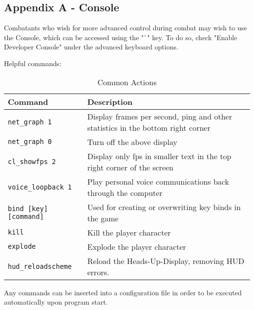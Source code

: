 \subsection{Appendix A - Console}
Combatants who wish for more advanced control during combat may wish to use the Console, which can be accessed using the "`" key. To do so, check "Enable Developer Console" under the advanced keyboard options.

Helpful commands:
\begin{table}[h!b!p!]
\caption{Common Actions}
\begin{tabular}{|l|p{10.5cm}|}
	\hline
		Command & Description\\
	\hline
	\texttt{net\_graph 1}&Display frames per second, ping and other statistics in the bottom right corner\\
	\texttt{net\_graph 0}&Turn off the above display\\
	\texttt{cl\_showfps 2}&Display only fps in smaller text in the top right corner of the screen\\
	\texttt{voice\_loopback 1}&Play personal voice communications back through the computer\\
	\texttt{bind [key] [command]}&Used for creating or overwriting key binds in the game\\
	\texttt{kill}&Kill the player character\\
	\texttt{explode}&Explode the player character\\
	\texttt{hud\_reloadscheme}&Reload the Heads-Up-Display, removing HUD errors.\\
  	\hline
\end{tabular}
\label{table_common_actions}
\end{table}


Any commands can be inserted into a configuration file in order to be executed automatically upon program start.